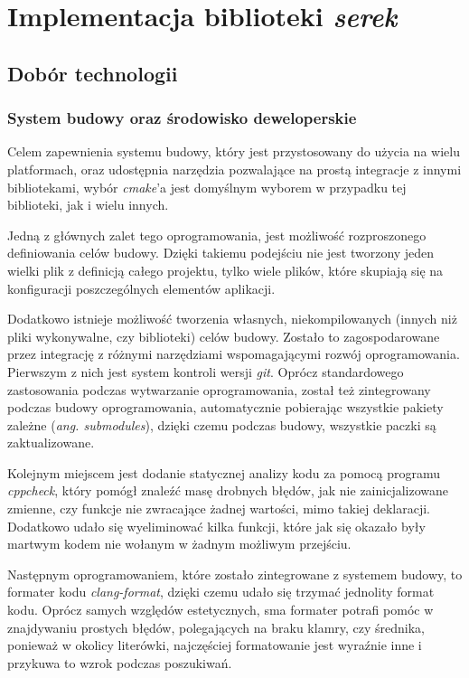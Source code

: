 \documentclass[12pt]{article}
\newcommand{\n}{\newline}
\begin{document}
	{
		\section{Implementacja biblioteki {\it serek}}

		{
			\subsection{Dobór technologii}

			{
				\subsubsection{System budowy oraz środowisko deweloperskie}

				Celem zapewnienia systemu budowy, który jest przystosowany do użycia na wielu platformach, oraz udostępnia narzędzia pozwalające na prostą
				integracje z innymi bibliotekami, wybór {\it cmake}'a\cite{cmake_docs} jest domyślnym wyborem w przypadku tej biblioteki, jak i wielu innych.\n

				Jedną z głównych zalet tego oprogramowania, jest możliwość rozproszonego definiowania celów budowy. Dzięki takiemu podejściu nie jest tworzony
				jeden wielki plik z definicją całego projektu, tylko wiele plików, które skupiają się na konfiguracji poszczególnych elementów aplikacji.\n

				Dodatkowo istnieje możliwość tworzenia własnych, niekompilowanych (innych niż pliki wykonywalne, czy biblioteki) celów budowy. Zostało to zagospodarowane
				przez integrację z różnymi narzędziami wspomagającymi rozwój oprogramowania. Pierwszym z nich jest system kontroli wersji {\it git}\cite{git_docs}. Oprócz standardowego
				zastosowania podczas wytwarzanie oprogramowania, został też zintegrowany podczas budowy oprogramowania, automatycznie pobierając wszystkie pakiety zależne
				({\it ang. submodules}), dzięki czemu podczas budowy, wszystkie paczki są zaktualizowane.\n

				Kolejnym miejscem jest dodanie statycznej analizy kodu za pomocą programu {\it cppcheck}\cite{cppcheck_repo}, który pomógł znaleźć masę drobnych błędów,
				jak nie zainicjalizowane zmienne, czy funkcje nie zwracające żadnej wartości, mimo takiej deklaracji. Dodatkowo udało się wyeliminować kilka funkcji,
				które jak się okazało były martwym kodem nie wołanym w żadnym możliwym przejściu.\n

				Następnym oprogramowaniem, które zostało zintegrowane z systemem budowy, to formater kodu {\it clang-format}\cite{clangformat_docs}, dzięki czemu
				udało się trzymać jednolity format kodu. Oprócz samych względów estetycznych, sma formater potrafi pomóc w znajdywaniu prostych błędów, polegających
				na braku klamry, czy średnika, ponieważ w okolicy literówki, najczęściej formatowanie jest wyraźnie inne i przykuwa to wzrok podczas poszukiwań.\n

}}}
\end{document}
